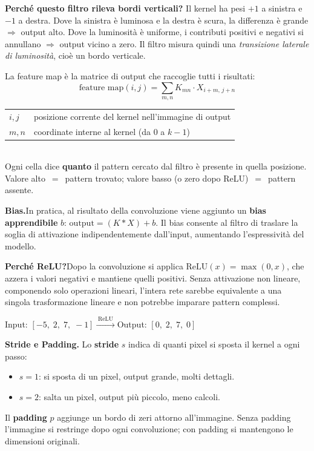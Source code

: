\documentclass[
  11pt,
]{article}
\begin{document}
\medskip
\textbf{Perché questo filtro rileva bordi verticali?}
Il kernel ha pesi $+1$ a sinistra e $-1$ a destra. Dove la sinistra è luminosa e la destra è scura, la differenza è grande $\Rightarrow$ output alto. Dove la luminosità è uniforme, i contributi positivi e negativi si annullano $\Rightarrow$ output vicino a zero. Il filtro misura quindi una \emph{transizione laterale di luminosità}, cioè un bordo verticale.

\begin{formulabox}[title={\textbf{Feature map}}]
La feature map è la matrice di output che raccoglie tutti i risultati:
\[
\text{feature map}(i,j) = \sum_{m,n} K_{mn}\cdot X_{i+m,\,j+n}
\]
\begin{tabular}{ll}
$i,j$ & posizione corrente del kernel nell'immagine di output \\
$m,n$ & coordinate interne al kernel (da $0$ a $k-1$) \\
\end{tabular}\\[4pt]
Ogni cella dice \textbf{quanto} il pattern cercato dal filtro è presente in quella posizione. Valore alto~$=$~pattern trovato; valore basso (o zero dopo ReLU)~$=$~pattern assente.
\end{formulabox}

\medskip
\textbf{Bias.}\quad In pratica, al risultato della convoluzione viene aggiunto un \textbf{bias apprendibile} $b$: $\text{output} = (K \ast X) + b$. Il bias consente al filtro di traslare la soglia di attivazione indipendentemente dall'input, aumentando l'espressività del modello.

\medskip
\textbf{Perché ReLU?}\quad Dopo la convoluzione si applica $\text{ReLU}(x)=\max(0,x)$, che azzera i valori negativi e mantiene quelli positivi. Senza attivazione non lineare, componendo solo operazioni lineari, l'intera rete sarebbe equivalente a una singola trasformazione lineare e non potrebbe imparare pattern complessi.

\begin{formulabox}[title={\textbf{Esempio ReLU}}]
Input: $[-5,\;2,\;7,\;-1]$\quad$\xrightarrow{\;\text{ReLU}\;}$\quad Output: $[0,\;2,\;7,\;0]$
\end{formulabox}

\medskip
\textbf{Stride e Padding.}\quad
Lo \textbf{stride} $s$ indica di quanti pixel si sposta il kernel a ogni passo:
\begin{itemize}
  \item $s=1$: si sposta di un pixel, output grande, molti dettagli.
  \item $s=2$: salta un pixel, output più piccolo, meno calcoli.
\end{itemize}
Il \textbf{padding} $p$ aggiunge un bordo di zeri attorno all'immagine. Senza padding l'immagine si restringe dopo ogni convoluzione; con padding si mantengono le dimensioni originali.
\end{document}
